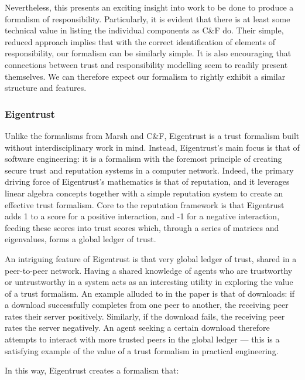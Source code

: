 Nevertheless, this presents an exciting insight into work to be done to produce a formalism of responsibility. Particularly, it is evident that there is at least some technical value in listing the individual components as C\&F do. Their simple, reduced approach implies that with the correct identification of elements of responsibility, our formalism can be similarly simple. It is also encouraging that connections between trust and responsibility modelling seem to readily present themselves. We can therefore expect our formalism to rightly exhibit a similar structure and features.\par

\subsubsection{Eigentrust}\label{subsec:eigentrust}
Unlike the formalisms from Marsh and C\&F, Eigentrust\cite{eigentrust} is a trust formalism built without interdisciplinary work in mind. Instead, Eigentrust's main focus is that of software engineering: it is a formalism with the foremost principle of creating secure trust and reputation systems in a computer network. Indeed, the primary driving force of Eigentrust's mathematics is that of reputation, and it leverages linear algebra concepts together with a simple reputation system to create an effective trust formalism. Core to the reputation framework is that Eigentrust adds 1 to a score for a positive interaction, and -1 for a negative interaction, feeding these scores into trust scores which, through a series of matrices and eigenvalues, forms a global ledger of trust.\par

An intriguing feature of Eigentrust is that very global ledger of trust, shared in a peer-to-peer network. Having a shared knowledge of agents who are trustworthy or untrustworthy in a system acts as an interesting utility in exploring the value of a trust formalism. An example alluded to in the paper is that of downloads: if a download successfully completes from one peer to another, the receiving peer rates their server positively. Similarly, if the download fails, the receiving peer rates the server negatively. An agent seeking a certain download therefore attempts to interact with more trusted peers in the global ledger --- this is a satisfying example of the value of a trust formalism in practical engineering.\par

In this way, Eigentrust creates a formalism that:

